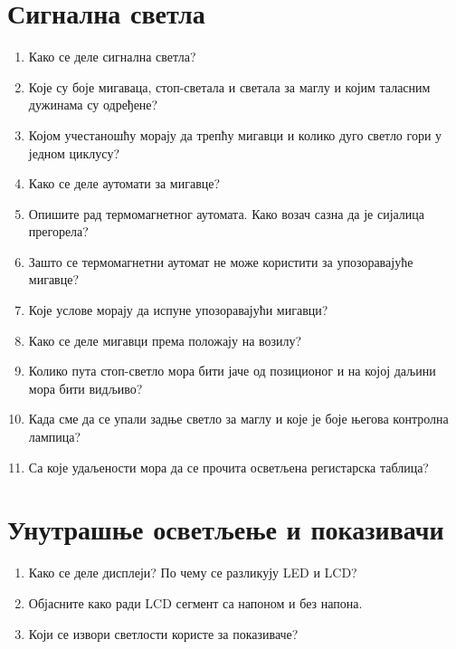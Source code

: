 \documentclass{article}
\begin{document}
\section*{Сигнална светла}
\begin{enumerate}[resume*=pitanja]
    \item Како се деле сигнална светла?
    \item Које су боје мигаваца, стоп-светала и светала за маглу и којим таласним дужинама су одређене?
    \item Којом учестаношћу морају да трепћу мигавци и колико дуго светло гори у једном циклусу?
    \item Како се деле аутомати за мигавце?
    \item Опишите рад термомагнетног аутомата. Како возач сазна да је сијалица прегорела?
    \item Зашто се термомагнетни аутомат не може користити за упозоравајуће мигавце?
    \item Које услове морају да испуне упозоравајући мигавци?
    \item Како се деле мигавци према положају на возилу?
    \item Колико пута стоп-светло мора бити јаче од позиционог и на којој даљини мора бити видљиво?
    \item Када сме да се упали задње светло за маглу и које је боје његова контролна лампица?
    \item Са које удаљености мора да се прочита осветљена регистарска таблица?
\end{enumerate}

\section*{Унутрашње осветљење и показивачи}
\begin{enumerate}[resume*=pitanja]
    \item Како се деле дисплеји? По чему се разликују LED и LCD?
    \item Објасните како ради LCD сегмент са напоном и без напона.
    \item Који се извори светлости користе за показиваче?
\end{enumerate}
\end{document}
